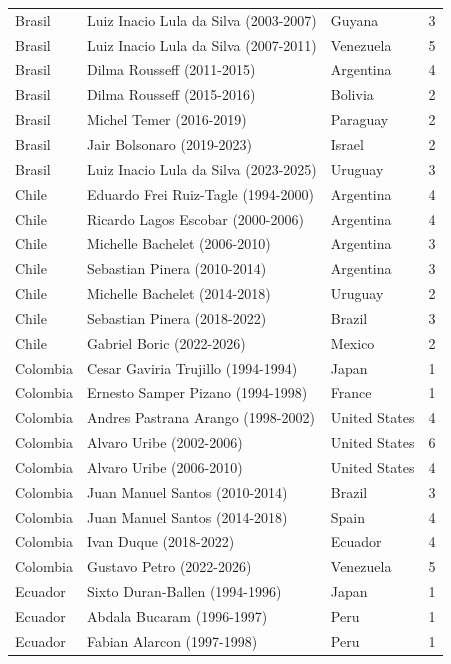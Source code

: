 \documentclass[11pt,a4paper]{article}
\begin{document}
\begin{longtable}{lllr}
  Brasil & Luiz Inacio Lula da Silva (2003-2007) & Guyana &   3 \\ 
  Brasil & Luiz Inacio Lula da Silva (2007-2011) & Venezuela &   5 \\ 
  Brasil & Dilma Rousseff (2011-2015) & Argentina &   4 \\ 
  Brasil & Dilma Rousseff (2015-2016) & Bolivia &   2 \\ 
  Brasil & Michel Temer (2016-2019) & Paraguay &   2 \\ 
  Brasil & Jair Bolsonaro (2019-2023) & Israel &   2 \\ 
  Brasil & Luiz Inacio Lula da Silva (2023-2025) & Uruguay &   3 \\ 
  Chile & Eduardo Frei Ruiz-Tagle (1994-2000) & Argentina &   4 \\ 
  Chile & Ricardo Lagos Escobar (2000-2006) & Argentina &   4 \\ 
  Chile & Michelle Bachelet (2006-2010) & Argentina &   3 \\ 
  Chile & Sebastian Pinera (2010-2014) & Argentina &   3 \\ 
  Chile & Michelle Bachelet (2014-2018) & Uruguay &   2 \\ 
  Chile & Sebastian Pinera (2018-2022) & Brazil &   3 \\ 
  Chile & Gabriel Boric (2022-2026) & Mexico &   2 \\ 
  Colombia & Cesar Gaviria Trujillo (1994-1994) & Japan &   1 \\ 
  Colombia & Ernesto Samper Pizano (1994-1998) & France &   1 \\ 
  Colombia & Andres Pastrana Arango (1998-2002) & United States &   4 \\ 
  Colombia & Alvaro Uribe (2002-2006) & United States &   6 \\ 
  Colombia & Alvaro Uribe (2006-2010) & United States &   4 \\ 
  Colombia & Juan Manuel Santos (2010-2014) & Brazil &   3 \\ 
  Colombia & Juan Manuel Santos (2014-2018) & Spain &   4 \\ 
  Colombia & Ivan Duque (2018-2022) & Ecuador &   4 \\ 
  Colombia & Gustavo Petro (2022-2026) & Venezuela &   5 \\ 
  Ecuador & Sixto Duran-Ballen (1994-1996) & Japan &   1 \\ 
  Ecuador & Abdala Bucaram (1996-1997) & Peru &   1 \\ 
  Ecuador & Fabian Alarcon (1997-1998) & Peru &   1 \\ 

\end{longtable}
\end{document}
